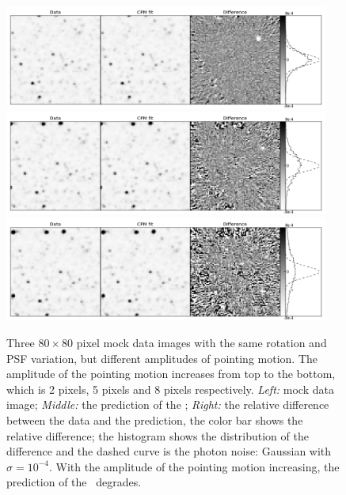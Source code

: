 \begin{figure}[p]
\begin{center}
\includegraphics[width=0.95\textwidth]{figures/cdi/f7a}
\includegraphics[width=0.95\textwidth]{figures/cdi/f7b}
\includegraphics[width=0.95\textwidth]{figures/cdi/f7c}
\end{center}
\caption[\cpmdiff\ with large pointing motion]{
  \label{large_motion}
  Three $80\times 80$ pixel mock data images with the same rotation and PSF variation, but different amplitudes of pointing motion. The amplitude of the pointing motion increases from top to the bottom, which is 2 pixels, 5 pixels and 8 pixels respectively. 
  \emph{Left:} mock data image;
  \emph{Middle:} the prediction of the \cpmdiff;
  \emph{Right:} the relative difference between the data and the prediction, the color bar shows the relative difference; the histogram shows the distribution of the difference and the dashed curve is the photon noise: Gaussian with $\sigma = 10^{-4}$. 
  With the amplitude of the pointing motion increasing, the prediction of the \cpmdiff\ degrades.
}
\end{figure}

